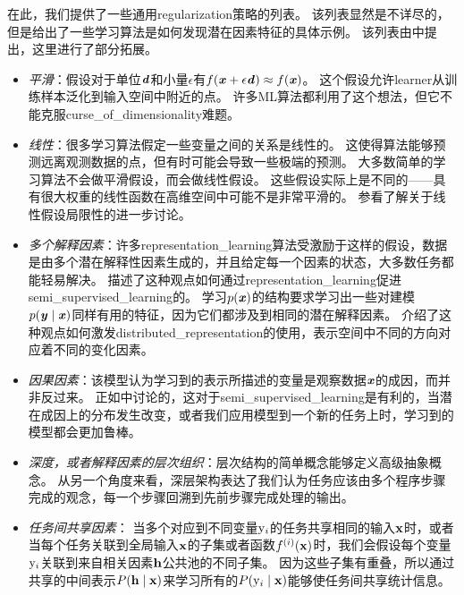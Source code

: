 
在此，我们提供了一些通用\gls{regularization}策略的列表。
该列表显然是不详尽的，但是给出了一些学习算法是如何发现潜在因素特征的具体示例。
该列表由\cite{Bengio-Courville-Vincent-TPAMI-2012}中提出，这里进行了部分拓展。
\begin{itemize}
	\item \emph{平滑}：假设对于单位$\boldsymbol{\mathit{d}}$和小量$\epsilon$有$f(\boldsymbol{\mathit{x}} + \epsilon \boldsymbol{\mathit{d}}) \approx f(\boldsymbol{\mathit{x}})$。
	这个假设允许\gls{learner}从训练样本泛化到输入空间中附近的点。
	许多\gls{ML}算法都利用了这个想法，但它不能克服\gls{curse_of_dimensionality}难题。


	\item \emph{线性}：很多学习算法假定一些变量之间的关系是线性的。
	这使得算法能够预测远离观测数据的点，但有时可能会导致一些极端的预测。
	大多数简单的学习算法不会做平滑假设，而会做线性假设。
	这些假设实际上是不同的——具有很大权重的线性函数在高维空间中可能不是非常平滑的。
	参看\cite{Goodfellow-2015-adversarial}了解关于线性假设局限性的进一步讨论。


	\item \emph{多个解释因素}：许多\gls{representation_learning}算法受激励于这样的假设，数据是由多个潜在解释性因素生成的，并且给定每一个因素的状态，大多数任务都能轻易解决。
	描述了这种观点如何通过\gls{representation_learning}促进\gls{semi_supervised_learning}的。
	学习$p(\boldsymbol{\mathit{x}})$的结构要求学习出一些对建模$p(\boldsymbol{\mathit{y}}\mid\boldsymbol{\mathit{x}})$同样有用的特征，因为它们都涉及到相同的潜在解释因素。
	介绍了这种观点如何激发\gls{distributed_representation}的使用，表示空间中不同的方向对应着不同的变化因素。


	\item \emph{因果因素}：该模型认为学习到的表示所描述的变量是观察数据$\boldsymbol{\mathit{x}}$的成因，而并非反过来。
	正如中讨论的，这对于\gls{semi_supervised_learning}是有利的，当潜在成因上的分布发生改变，或者我们应用模型到一个新的任务上时，学习到的模型都会更加鲁棒。


	\item \emph{深度，或者解释因素的层次组织}：层次结构的简单概念能够定义高级抽象概念。
	从另一个角度来看，深层架构表达了我们认为任务应该由多个程序步骤完成的观念，每一个步骤回溯到先前步骤完成处理的输出。


	\item \emph{任务间共享因素}：
	当多个对应到不同变量$\mathrm{y}_i$的任务共享相同的输入$\mathbf{x}$时，或者当每个任务关联到全局输入$\mathbf{x}$的子集或者函数$f^{(i)}(\mathbf{x})$时，我们会假设每个变量$\mathrm{y}_i$关联到来自相关因素$\mathbf{h}$公共池的不同子集。
	因为这些子集有重叠，所以通过共享的中间表示$ P(\mathbf{h} \mid \mathbf{x})$来学习所有的$P(\mathrm{y}_i \mid \mathbf{x})$能够使任务间共享统计信息。



\end{itemize}
